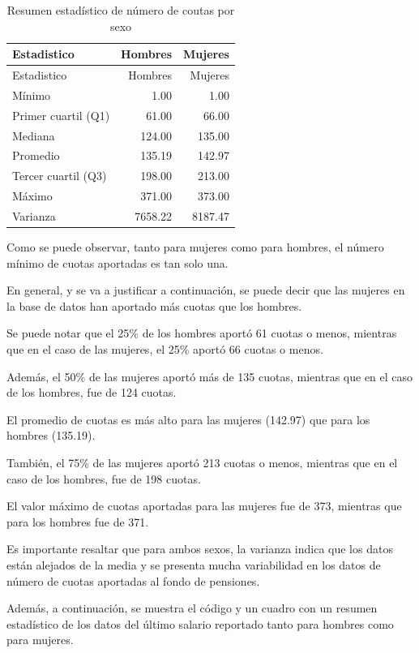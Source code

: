 \documentclass[
]{article}
\begin{document}
\begin{longtable}[]{@{}lrr@{}}
\caption{Resumen estadístico de número de coutas por
sexo}\tabularnewline
\toprule\noalign{}
Estadistico & Hombres & Mujeres \\
\midrule\noalign{}
\endfirsthead
\toprule\noalign{}
Estadistico & Hombres & Mujeres \\
\midrule\noalign{}
\endhead
\bottomrule\noalign{}
\endlastfoot
Mínimo & 1.00 & 1.00 \\
Primer cuartil (Q1) & 61.00 & 66.00 \\
Mediana & 124.00 & 135.00 \\
Promedio & 135.19 & 142.97 \\
Tercer cuartil (Q3) & 198.00 & 213.00 \\
Máximo & 371.00 & 373.00 \\
Varianza & 7658.22 & 8187.47 \\
\end{longtable}

Como se puede observar, tanto para mujeres como para hombres, el número
mínimo de cuotas aportadas es tan solo una.

En general, y se va a justificar a continuación, se puede decir que las
mujeres en la base de datos han aportado más cuotas que los hombres.

Se puede notar que el 25\% de los hombres aportó 61 cuotas o menos,
mientras que en el caso de las mujeres, el 25\% aportó 66 cuotas o
menos.

Además, el 50\% de las mujeres aportó más de 135 cuotas, mientras que en
el caso de los hombres, fue de 124 cuotas.

El promedio de cuotas es más alto para las mujeres (142.97) que para los
hombres (135.19).

También, el 75\% de las mujeres aportó 213 cuotas o menos, mientras que
en el caso de los hombres, fue de 198 cuotas.

El valor máximo de cuotas aportadas para las mujeres fue de 373,
mientras que para los hombres fue de 371.

Es importante resaltar que para ambos sexos, la varianza indica que los
datos están alejados de la media y se presenta mucha variabilidad en los
datos de número de cuotas aportadas al fondo de pensiones.

Además, a continuación, se muestra el código y un cuadro con un resumen
estadístico de los datos del último salario reportado tanto para hombres
como para mujeres.
\end{document}
